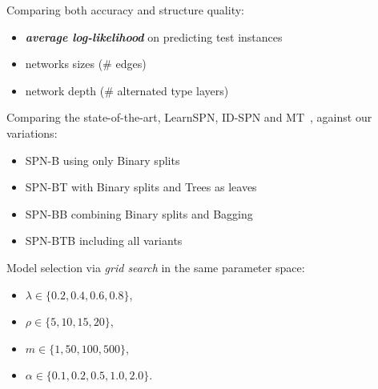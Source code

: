 \documentclass[final]{beamer}
\begin{document}
\begin{frame}{}
\begin{textblock}{25.7}
    Comparing both accuracy and structure quality:
    \begin{itemize}
    \item \emph{\textbf{average log-likelihood}} on predicting test
      instances
    \item networks sizes (\# edges)
    \item network depth (\# alternated type layers)

    \end{itemize}\bigskip
    
    Comparing the state-of-the-art, \textsf{LearnSPN},
    \textsf{ID-SPN} and \textsf{MT}~\parencite{Meila2000}, against our
    variations:
    
    \begin{itemize}
    \item \textsf{SPN-B} using only \textsf{B}inary splits
    \item \textsf{SPN-BT} with \textsf{B}inary splits and \textsf{T}rees as leaves
    \item \textsf{SPN-BB} combining \textsf{B}inary splits and \textsf{B}agging
      \item \textsf{SPN-BTB} including all variants
    \end{itemize}\bigskip
    
    Model selection via \textit{grid search} in the same parameter
    space:
    \begin{minipage}[t]{0.35\linewidth}
      \begin{itemize}
      \item $\lambda \in \{0.2, 0.4, 0.6, 0.8\}$,
      \item $\rho \in \{5, 10, 15, 20\}$, 
      \end{itemize}
    \end{minipage}\begin{minipage}[t]{0.5\linewidth}
      \begin{itemize}
      \item $m \in \{1, 50, 100, 500\}$, 
      \item $\alpha \in \{ 0.1, 0.2, 0.5, 1.0, 2.0\}$.
      \end{itemize}
    \end{minipage}


\end{textblock}
\end{frame}
\end{document}
